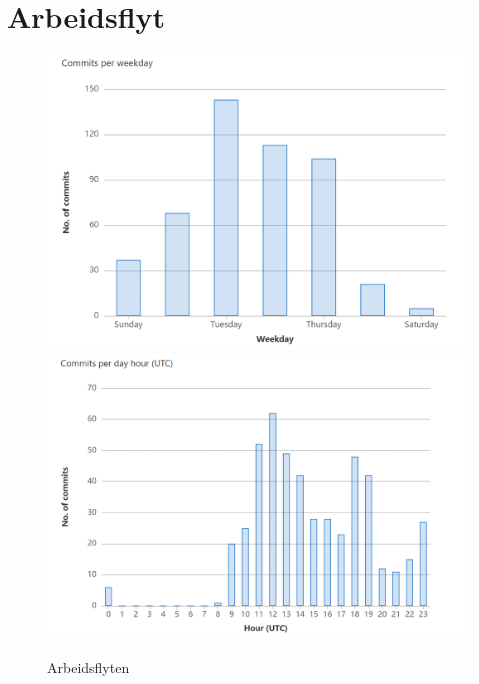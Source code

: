\addappendix
\section{Arbeidsflyt}
\label{sec:Arbeidsflyt}
\begin{figure}[H]
\begin{center}
    \includegraphics[width=1\columnwidth]{bilder/Appendiks/commitsperweekday.png}
    \includegraphics[width=1\columnwidth]{bilder/Appendiks/commitsperhour.png}
    \caption{Arbeidsflyten\label{Fig:commitsperhour}}
\end{center}
\end{figure}
